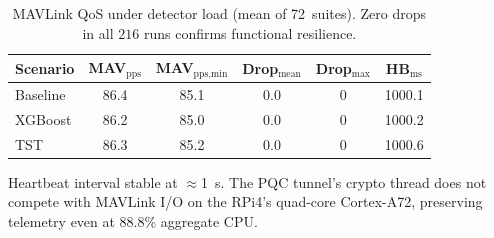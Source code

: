 \begin{table}[!t]
\centering
\caption{MAVLink QoS under detector load (mean of 72~suites).
  Zero drops in all $216$ runs confirms functional resilience.}
\label{tab:mavlink_qos}
\footnotesize
\setlength{\tabcolsep}{4pt}
\begin{tabular}{@{}l
  S[table-format=2.1]
  S[table-format=2.1]
  S[table-format=1.1]
  S[table-format=1.0]
  S[table-format=4.1]@{}}
\toprule
\textbf{Scenario}
  & {MAV$_{\text{pps}}$}
  & {MAV$_{\text{pps,min}}$}
  & {Drop$_{\text{mean}}$}
  & {Drop$_{\text{max}}$}
  & {HB$_{\text{ms}}$} \\
\midrule
Baseline & 86.4 & 85.1 & 0.0 & 0 & 1000.1 \\
XGBoost  & 86.2 & 85.0 & 0.0 & 0 & 1000.2 \\
TST      & 86.3 & 85.2 & 0.0 & 0 & 1000.6 \\
\bottomrule
\end{tabular}
\begin{tablenotes}
\footnotesize
\item Heartbeat interval stable at $\approx$\SI{1}{\second}.  The PQC
  tunnel's crypto thread does not compete with MAVLink I/O on the
  RPi4's quad-core Cortex-A72, preserving telemetry even at 88.8\%
  aggregate CPU.
\end{tablenotes}
\end{table}

